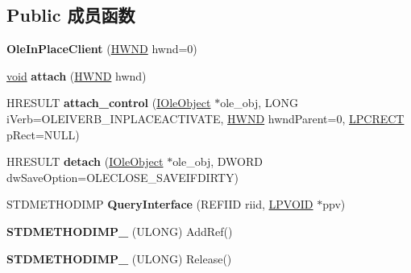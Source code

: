 \subsection*{Public 成员函数}
\begin{DoxyCompactItemize}
\item 
\mbox{\label{struct_ole_in_place_client_a7295a7932ff1b7ebacdffaa587f3cd80}} 
{\bfseries Ole\+In\+Place\+Client} (\hyperlink{interfacevoid}{H\+W\+ND} hwnd=0)
\item 
\mbox{\label{struct_ole_in_place_client_a49b1b4eae64cffb4595e042a580ec763}} 
\hyperlink{interfacevoid}{void} {\bfseries attach} (\hyperlink{interfacevoid}{H\+W\+ND} hwnd)
\item 
\mbox{\label{struct_ole_in_place_client_af61fe64e4e346ab31f0f5a8a65535323}} 
H\+R\+E\+S\+U\+LT {\bfseries attach\+\_\+control} (\hyperlink{interface_i_ole_object}{I\+Ole\+Object} $\ast$ole\+\_\+obj, L\+O\+NG i\+Verb=O\+L\+E\+I\+V\+E\+R\+B\+\_\+\+I\+N\+P\+L\+A\+C\+E\+A\+C\+T\+I\+V\+A\+TE, \hyperlink{interfacevoid}{H\+W\+ND} hwnd\+Parent=0, \hyperlink{structtag_r_e_c_t}{L\+P\+C\+R\+E\+CT} p\+Rect=N\+U\+LL)
\item 
\mbox{\label{struct_ole_in_place_client_aa725f911db9148b191dec94b6439aa46}} 
H\+R\+E\+S\+U\+LT {\bfseries detach} (\hyperlink{interface_i_ole_object}{I\+Ole\+Object} $\ast$ole\+\_\+obj, D\+W\+O\+RD dw\+Save\+Option=O\+L\+E\+C\+L\+O\+S\+E\+\_\+\+S\+A\+V\+E\+I\+F\+D\+I\+R\+TY)
\item 
\mbox{\label{struct_ole_in_place_client_a608600583fb190b993fd75a10eddc419}} 
S\+T\+D\+M\+E\+T\+H\+O\+D\+I\+MP {\bfseries Query\+Interface} (R\+E\+F\+I\+ID riid, \hyperlink{interfacevoid}{L\+P\+V\+O\+ID} $\ast$ppv)
\item 
\mbox{\label{struct_ole_in_place_client_a18812998130a10c3b651c8f0327d407e}} 
{\bfseries S\+T\+D\+M\+E\+T\+H\+O\+D\+I\+M\+P\+\_\+} (U\+L\+O\+NG) Add\+Ref()
\item 
\mbox{\label{struct_ole_in_place_client_ab4da54a3b422c397358b6cd0c7c3eca9}} 
{\bfseries S\+T\+D\+M\+E\+T\+H\+O\+D\+I\+M\+P\+\_\+} (U\+L\+O\+NG) Release()

\end{DoxyCompactItemize}
